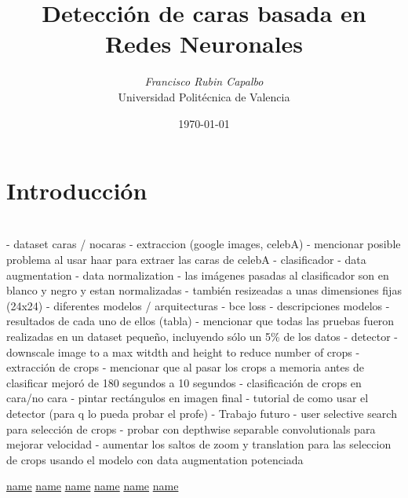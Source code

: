 \documentclass[a4paper, 11pt]{article}
\title{\Large{\textbf{Detección de caras basada en Redes Neuronales}}}
\author{\textit{Francisco Rubin Capalbo}\\
		Universidad Politécnica de Valencia }
\date{\today}
\begin{document}
    
    \maketitle
    \section{Introducción}
    
    \section{}


- dataset caras / nocaras
	- extraccion (google images, celebA)
	 	- mencionar posible problema al usar haar para extraer las caras de celebA
- clasificador
	- data augmentation
	- data normalization
		- las imágenes pasadas al clasificador son en blanco y negro  y estan normalizadas
		- también resizeadas a unas dimensiones fijas (24x24)
	- diferentes modelos / arquitecturas
		- bce loss
		- descripciones modelos
		- resultados de cada uno de ellos (tabla)
			- mencionar que todas las pruebas fueron realizadas en un dataset pequeño, incluyendo sólo un 5\% de los datos
- detector
	- downscale image to a max witdth and height to reduce number of crops
	- extracción de crops 
		- mencionar que al pasar los crops a memoria antes de clasificar mejoró de 180 segundos a 10 segundos
	- clasificación de crops en cara/no cara
	- pintar rectángulos en imagen final
	- tutorial de como usar el detector (para q lo pueda probar el profe)
- Trabajo futuro
	- user selective search para selección de crops
	- probar con depthwise separable convolutionals para mejorar velocidad
	- aumentar los saltos de zoom y translation para las seleccion de crops usando el modelo con data augmentation potenciada
	

\begin{thebibliography}{50}
	
	\href{url }{name}
	\href{url }{name}
	\href{url }{name}
	\href{url }{name}
	\href{url }{name}
	\href{url }{name}
	
\end{thebibliography}
\end{document}

